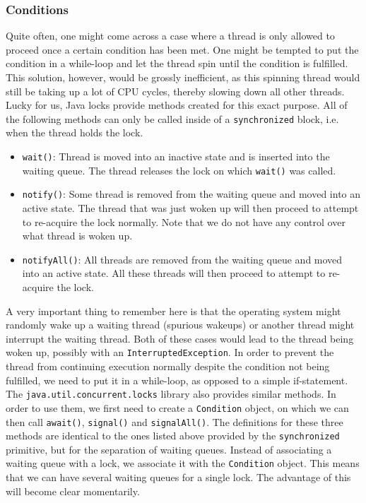\documentclass[main]{subfiles}
\begin{document}

\subsubsection{Conditions}
Quite often, one might come across a case where a thread is only allowed to proceed once a certain condition has been met. One might be tempted to put the condition in a while-loop and let the thread spin until the condition is fulfilled. This solution, however, would be grossly inefficient, as this spinning thread would still be taking up a lot of CPU cycles, thereby slowing down all other threads.\\[3mm]
Lucky for us, Java locks provide methods created for this exact purpose. All of the following methods can only be called inside of a \texttt{synchronized} block, i.e. when the thread holds the lock.
\begin{itemize}
    \item \texttt{wait()}: Thread is moved into an inactive state and is inserted into the waiting queue. The thread releases the lock on which \texttt{wait()} was called.
    \item \texttt{notify()}: Some thread is removed from the waiting queue and moved into an active state. The thread that was just woken up will then proceed to attempt to re-acquire the lock normally. Note that we do not have any control over what thread is woken up.
    \item \texttt{notifyAll()}: All threads are removed from the waiting queue and moved into an active state. All these threads will then proceed to attempt to re-acquire the lock.
\end{itemize}
A very important thing to remember here is that the operating system might randomly wake up a waiting thread (spurious wakeups) or another thread might interrupt the waiting thread. Both of these cases would lead to the thread being woken up, possibly with an \texttt{InterruptedException}. In order to prevent the thread from continuing execution normally despite the condition not being fulfilled, we need to put it in a while-loop, as opposed to a simple if-statement.\\[3mm]
The \texttt{java.util.concurrent.locks} library also provides similar methods. In order to use them, we first need to create a \texttt{Condition} object, on which we can then call \texttt{await()}, \texttt{signal()} and \texttt{signalAll()}. The definitions for these three methods are identical to the ones listed above provided by the \texttt{synchronized} primitive, but for the separation of waiting queues. Instead of associating a waiting queue with a lock, we associate it with the \texttt{Condition} object. This means that we can have several waiting queues for a single lock. The advantage of this will become clear momentarily.\\[3mm]
\end{document}
